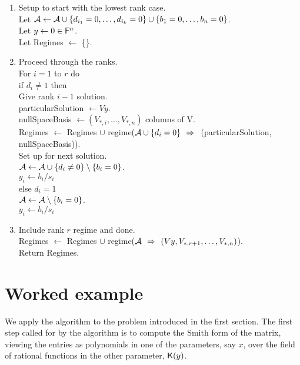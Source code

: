 \documentclass[10pt]{article}
\begin{document}
\begin{enumerate}
\item \bc Setup to start with the lowest rank case.\ec\\
Let ${\cal A} \leftarrow {\cal A} 
  \cup \{d_{i_1} = 0, \ldots, d_{i_k} = 0\} 
  \cup \{b_1 = 0, \ldots, b_n = 0\}$.\\
Let $y \leftarrow 0 \in {\mathsf F}^n$.\\
Let Regimes $\leftarrow$ \{\}.\\
\item
\bc Proceed through the ranks. \ec\\
For $i = 1$ to $r$ do\\
\jog if $d_i \neq 1$ then\\
\jogg \bc Give rank $i-1$ solution.\ec\\
\jogg particularSolution $\leftarrow Vy$.\\
\jogg nullSpaceBasis $\leftarrow (V_{*,i}, \ldots, V_{*,n})$ \bc columns of V\ec.\\
\jogg Regimes $\leftarrow$ Regimes $\cup$ regime(${\cal A} \cup \{d_i = 0 \}{~~\Rightarrow~~} 
                                                   $(particularSolution, 
                                                   nullSpaceBasis)). \\
\jogg \bc Set up for next solution.\ec\\
\jogg ${\cal A} \leftarrow {\cal A} \cup \{d_i \neq 0\} \setminus \{b_i = 0 \}$. \\
\jogg $y_i \leftarrow b_i / s_i$\\
\jog else \bc $d_i = 1$ \ec\\
\jogg ${\cal A} \leftarrow {\cal A} \setminus \{b_i = 0 \}$. \\
\jogg $y_i \leftarrow b_i / s_i$\\
\item
\bc Include rank $r$ regime and done.\ec\\
Regimes $\leftarrow$ Regimes 
              $\cup$ regime(${\cal A} {~~\Rightarrow~~} (Vy, V_{*,r+1}, \ldots, V_{*,n})$).\\
Return Regimes.
\end{enumerate}
\newpage
\section{Worked example}
We apply the algorithm to the problem introduced in the first section.
The first step called for by the algorithm is to compute the Smith form of the 
matrix, viewing the entries as polynomials in one of the parameters, say $x$, over the field
of rational functions in the other parameter, ${\mathsf K}(y)$.  
\end{document}
